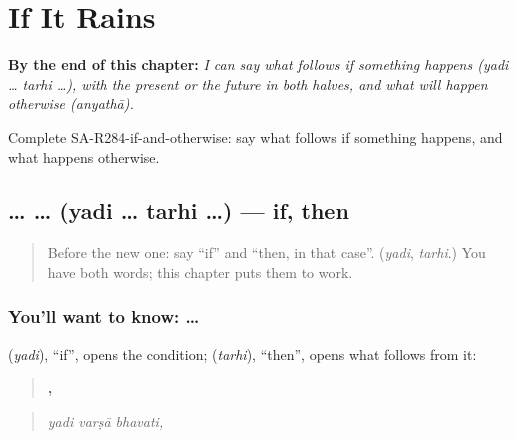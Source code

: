 
\chapter{If It Rains}
\label{ch:sa-if-it-rains}

\begin{chapteropening}
\textbf{By the end of this chapter:} \emph{I can say what follows if something happens (yadi … tarhi …), with the present or the future in both halves, and what will happen otherwise (anyathā).}

Complete SA-R284-if-and-otherwise: say what follows if something happens, and what happens otherwise.
\end{chapteropening}

\section[\texorpdfstring{\sk{यदि} … \sk{तर्हि} … (yadi … tarhi …)}{यदि … तर्हि … (yadi … tarhi …)}]{ …  … (yadi … tarhi …) — if, then}

\label{lesson:SA-C284-yadi-tarhi}



\begin{quote}
Before the new one: say \textquotedblleft{}if\textquotedblright{} and \textquotedblleft{}then, in that case\textquotedblright{}. (\emph{yadi}, \emph{tarhi}.) You have both words; this chapter puts them to work.
\end{quote}

\subsection*{You'll want to know:  … }
\textbf{} (\emph{yadi}), \textquotedblleft{}if\textquotedblright{}, opens the condition; \textbf{} (\emph{tarhi}), \textquotedblleft{}then\textquotedblright{}, opens what follows from it:

\begin{quote}
\textbf{  ,}
\end{quote}

\begin{quote}
\emph{yadi varṣā bhavati,}
\end{quote}

